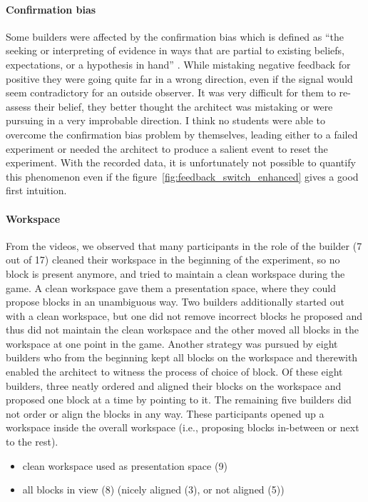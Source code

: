 \paragraph{Confirmation bias} Some builders were affected by the confirmation bias which is defined as ``the seeking or interpreting of evidence in ways that are partial to existing beliefs, expectations, or a hypothesis in hand'' \cite{nickerson1998confirmation}. While mistaking negative feedback for positive they were going quite far in a wrong direction, even if the signal would seem contradictory for an outside observer. It was very difficult for them to re-assess their belief, they better thought the architect was mistaking or were pursuing in a very improbable direction. I think no students were able to overcome the confirmation bias problem by themselves, leading either to a failed experiment or needed the architect to produce a salient event to reset the experiment. With the recorded data, it is unfortunately not possible to quantify this phenomenon even if the figure~\ref{fig:feedback_switch_enhanced} gives a good first intuition.

\paragraph{Workspace} From the videos, we observed that many participants in the role of the builder (7 out of 17) cleaned their workspace in the beginning of the experiment, so no block is present anymore, and tried to maintain a clean workspace during the game. A clean workspace gave them a presentation space, where they could propose blocks in an unambiguous way. Two builders additionally started out with a clean workspace, but one did not remove incorrect blocks he proposed and thus did not maintain the clean workspace and the other moved all blocks in the workspace at one point in the game. Another strategy was pursued by eight builders who from the beginning kept all blocks on the workspace and therewith enabled the architect to witness the process of choice of block. Of these eight builders, three neatly ordered and aligned their blocks on the workspace and proposed one block at a time by pointing to it. The remaining five builders did not order or align the blocks in any way. These participants opened up a workspace inside the overall workspace (i.e., proposing blocks in-between or next to the rest).
\begin{itemize}
\item clean workspace used as presentation space (9)
\item all blocks in view (8) (nicely aligned (3), or not aligned (5))
\end{itemize}

